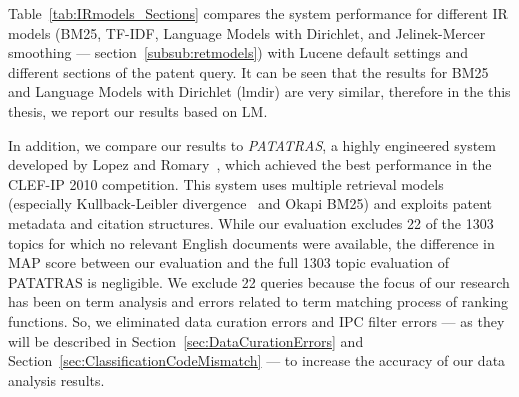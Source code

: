 Table~\ref{tab:IRmodels_Sections} compares the system performance for different IR models 
(BM25, TF-IDF, Language Models with Dirichlet, and Jelinek-Mercer smoothing --- section~\ref{subsub:retmodels}) with Lucene default settings and different sections of the patent query.
It can be seen that the results for BM25 and Language Models with Dirichlet (lmdir) are very similar, therefore in the this thesis, we report our results based on LM.    


In addition, we compare our results to \textit{PATATRAS}, a highly engineered system developed by Lopez and Romary~\citep{lopez2010experiments}, which achieved the best performance in the CLEF-IP 2010 competition. This system uses multiple retrieval models (especially Kullback-Leibler divergence~\cite{Baeza-Yates2011} and Okapi BM25) and exploits patent metadata and citation structures.  While our evaluation excludes 22 of the 1303 topics for which no relevant English documents were available, the difference in MAP score between our evaluation and the full 1303 topic evaluation of PATATRAS is negligible. We exclude 22 queries because the focus of our research has been on term analysis and errors related to term matching process of ranking functions. So, we eliminated data curation errors and IPC filter errors --- as they will be described in Section~\ref{sec:DataCurationErrors} and Section~\ref{sec:ClassificationCodeMismatch} --- to increase the accuracy of our data analysis results. 
% 


